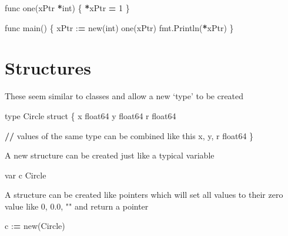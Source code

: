 \documentclass[]{book}
\newenvironment{Shaded}{\begin{snugshade}}{\end{snugshade}}
\newcommand{\BuiltInTok}[1]{#1}
\newcommand{\DecValTok}[1]{\textcolor[rgb]{0.00,0.00,0.81}{#1}}
\newcommand{\NormalTok}[1]{#1}
\newcommand{\OperatorTok}[1]{\textcolor[rgb]{0.81,0.36,0.00}{\textbf{#1}}}
\begin{document}
\begin{Shaded}
\begin{Highlighting}[]
\NormalTok{func one(xPtr }\OperatorTok{*}\BuiltInTok{int}\NormalTok{) \{}
    \OperatorTok{*}\NormalTok{xPtr }\OperatorTok{=} \DecValTok{1}        
\NormalTok{\}}
                    
\NormalTok{func main() \{                                                                                                                 }
\NormalTok{    xPtr :}\OperatorTok{=}\NormalTok{ new(}\BuiltInTok{int}\NormalTok{)                                                }
\NormalTok{    one(xPtr)                                                       }
\NormalTok{    fmt.Println(}\OperatorTok{*}\NormalTok{xPtr)                                              }
\NormalTok{\}                                                                   }
\end{Highlighting}
\end{Shaded}

\hypertarget{structures}{%
\section{Structures}\label{structures}}

These seem similar to classes and allow a new `type' to be created

\begin{Shaded}
\begin{Highlighting}[]
\BuiltInTok{type}\NormalTok{ Circle struct \{}
\NormalTok{x float64}
\NormalTok{y float64}
\NormalTok{r float64}

    \OperatorTok{//}\NormalTok{ values of the same }\BuiltInTok{type}\NormalTok{ can be combined like this}
\NormalTok{    x, y, r float64 }
\NormalTok{\}                   }
\end{Highlighting}
\end{Shaded}

A new structure can be created just like a typical variable

\begin{Shaded}
\begin{Highlighting}[]
\NormalTok{var c Circle}
\end{Highlighting}
\end{Shaded}

A structure can be created like pointers which will set all values to their zero value like 0, 0.0, "" and return a pointer

\begin{Shaded}
\begin{Highlighting}[]
\NormalTok{c :}\OperatorTok{=}\NormalTok{ new(Circle)}
\end{Highlighting}
\end{Shaded}
\end{document}
